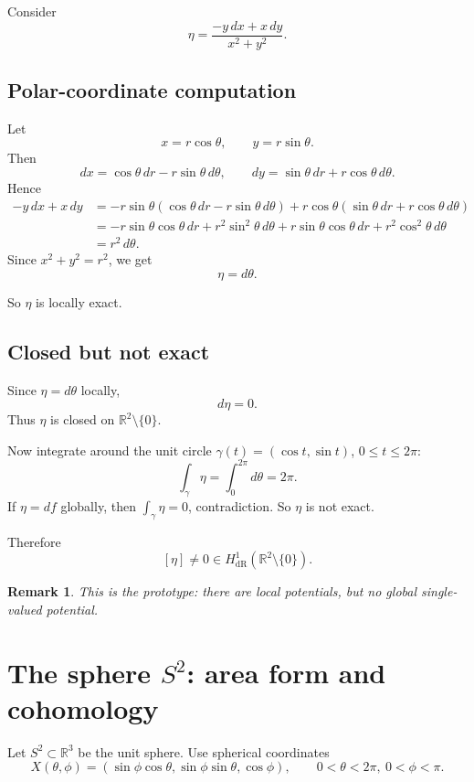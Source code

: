 \documentclass[11pt]{article}
\newtheorem{remark}{Remark}
\begin{document}
	Consider
	\[
	\eta=\frac{-y\,dx+x\,dy}{x^2+y^2}.
	\]
	
	\subsection{Polar-coordinate computation}
	
	Let
	\[
	x=r\cos\theta,\qquad y=r\sin\theta.
	\]
	Then
	\[
	dx=\cos\theta\,dr-r\sin\theta\,d\theta,
	\qquad
	dy=\sin\theta\,dr+r\cos\theta\,d\theta.
	\]
	Hence
	\begin{align*}
		-y\,dx+x\,dy
		&=
		-r\sin\theta(\cos\theta\,dr-r\sin\theta\,d\theta)
		+r\cos\theta(\sin\theta\,dr+r\cos\theta\,d\theta)\\
		&=
		-r\sin\theta\cos\theta\,dr+r^2\sin^2\theta\,d\theta
		+r\sin\theta\cos\theta\,dr+r^2\cos^2\theta\,d\theta\\
		&=
		r^2\,d\theta.
	\end{align*}
	Since \(x^2+y^2=r^2\), we get
	\[
	\eta=d\theta.
	\]
	
	So \(\eta\) is locally exact.
	
	\subsection{Closed but not exact}
	
	Since \(\eta=d\theta\) locally,
	\[
	d\eta=0.
	\]
	Thus \(\eta\) is closed on \(\mathbb{R}^2\setminus\{0\}\).
	
	Now integrate around the unit circle \(\gamma(t)=(\cos t,\sin t)\), \(0\le t\le 2\pi\):
	\[
	\int_\gamma \eta = \int_0^{2\pi} d\theta = 2\pi.
	\]
	If \(\eta=df\) globally, then \(\int_\gamma \eta=0\), contradiction. So \(\eta\) is not exact.
	
	Therefore
	\[
	[\eta]\neq 0 \in H^1_{\mathrm{dR}}(\mathbb{R}^2\setminus\{0\}).
	\]
	
	\begin{remark}
		This is the prototype: there are local potentials, but no global single-valued potential.
	\end{remark}
	
	\section{The sphere \(S^2\): area form and cohomology}
	
	Let \(S^2\subset \mathbb{R}^3\) be the unit sphere. Use spherical coordinates
	\[
	X(\theta,\phi)=
	(\sin\phi\cos\theta,\sin\phi\sin\theta,\cos\phi),
	\qquad
	0<\theta<2\pi,\ 0<\phi<\pi.
	\]
	
\end{document}
